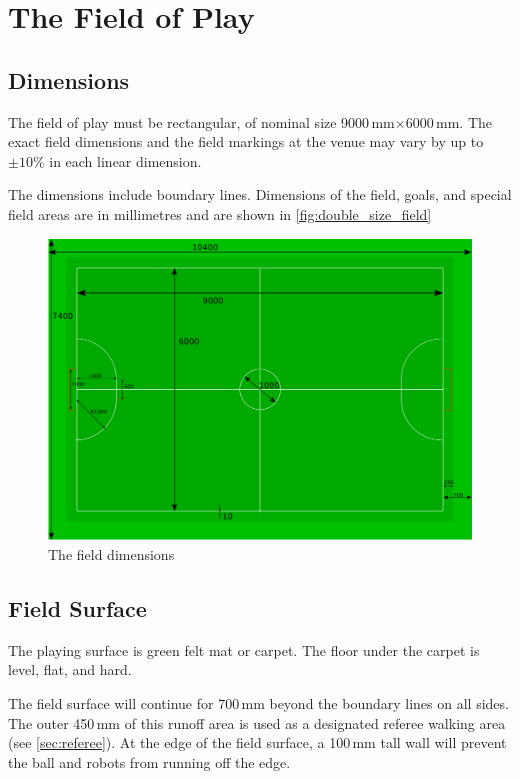 \section{The Field of Play}\label{sec:field-of-play}

\subsection{Dimensions}
The field of play must be rectangular,
of nominal size 9000\,mm$\times$6000\,mm.
The exact field dimensions and the field markings at the venue may vary by up
to $\pm10\%$ in each linear dimension.

The dimensions include boundary lines.
Dimensions of the field, goals, and special field areas are in millimetres and
are shown in \autoref{fig:double_size_field}

\begin{figure}[ht] %
  \centering
  \includegraphics[width=0.8\columnwidth]{img/double-size-field.png}
  \caption{The field dimensions }
  \label{fig:double_size_field}
\end{figure}


\subsection{Field Surface}
The playing surface is green felt mat or carpet.
The floor under the carpet is level, flat, and hard.

The field surface will continue for 700\,mm beyond
the boundary lines on all sides.
The outer 450\,mm of this runoff area is used as a
designated referee walking area (see \autoref{sec:referee}).
At the edge of the field surface, a 100\,mm tall wall will prevent the ball and
robots from running off the edge.

